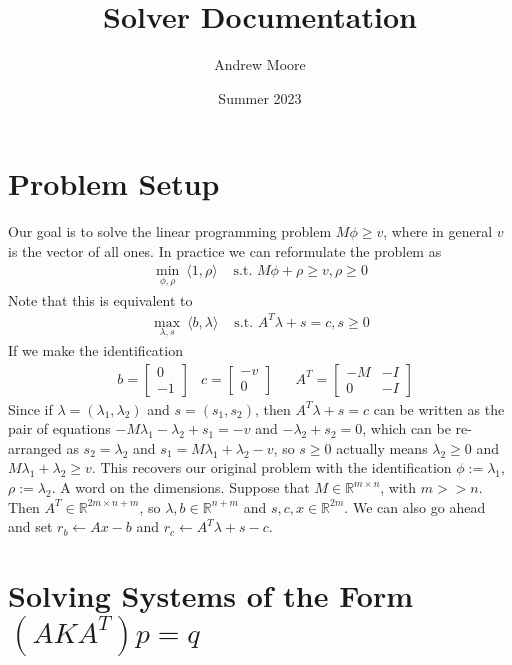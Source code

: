 \documentclass{article}
\title{Solver Documentation}
\author{Andrew Moore}
\date{Summer 2023}
\newcommand{\R}{{\mathbb{R}}}
\begin{document}
\maketitle

\section{Problem Setup}

Our goal is to solve the linear programming problem $M\phi \geq v$, where in general $v$ is the vector of all ones. In practice we can reformulate the problem as 
\begin{align*}
		\min_{\phi, \rho}\ \langle 1, \rho\rangle &\text{ s.t. } M\phi + \rho \geq v, \rho \geq 0
\end{align*}
Note that this is equivalent to
\begin{align*}
		\max_{\lambda, s}\ \langle b, \lambda \rangle &\text{ s.t. } A^T \lambda + s = c, s \geq 0
\end{align*}
If we make the identification
\begin{align*}
		&b = \begin{bmatrix}
				0\\
				-1\end{bmatrix} 
		&c = \begin{bmatrix}
				-v\\
				0\end{bmatrix}
		&&A^T = \begin{bmatrix}
				-M & -I\\
				0  & -I
		\end{bmatrix}
\end{align*}
Since if $\lambda = (\lambda_1, \lambda_2)$ and $s = (s_1, s_2)$, then $A^T\lambda + s = c$ can be written as the pair of equations $-M\lambda_1 - \lambda_2 + s_1 = -v$ and $-\lambda_2 + s_2 = 0$, which can be re-arranged as $s_2 = \lambda_2$ and $s_1 = M\lambda_1 + \lambda_2 - v$, so $s \geq 0$ actually means $\lambda_2 \geq 0$ and $M\lambda_1 + \lambda_2 \geq v$. This recovers our original problem with the identification $\phi := \lambda_1$, $\rho := \lambda_2$. A word on the dimensions. Suppose that $M \in \R^{m \times n}$, with $m >> n$. Then $A^T \in \R^{2m \times n+m}$, so $\lambda, b \in \R^{n+m}$ and $s, c, x \in \R^{2m}$. We can also go ahead and set $r_b \leftarrow Ax - b$ and $r_c \leftarrow A^T\lambda + s - c$. 

\section{Solving Systems of the Form $(AKA^T)p=q$}
\end{document}
